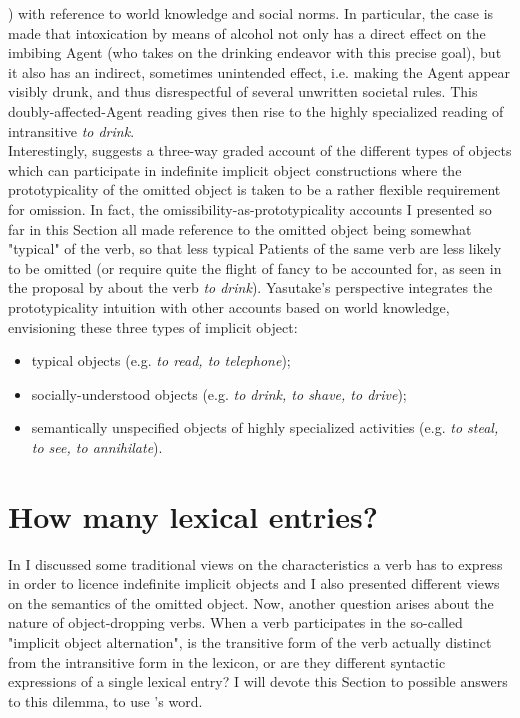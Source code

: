 \textcite[420]{Naess2011}) with reference to world knowledge and social norms. In particular, the case is made that intoxication by means of alcohol not only has a direct effect on the imbibing Agent (who takes on the drinking endeavor with this precise goal), but it also has an indirect, sometimes unintended effect, i.e. making the Agent appear visibly drunk, and thus disrespectful of several unwritten societal rules. This doubly-affected-Agent reading gives then rise to the highly specialized reading of intransitive \textit{to drink}.\\
Interestingly, \textcite[48-50]{Yasutake1987} suggests a three-way graded account of the different types of objects which can participate in indefinite implicit object constructions where the prototypicality of the omitted object is taken to be a rather flexible requirement for omission. In fact, the omissibility-as-prototypicality accounts I presented so far in this Section all made reference to the omitted object being somewhat "typical" of the verb, so that less typical Patients of the same verb are less likely to be omitted (or require quite the flight of fancy to be accounted for, as seen in the proposal by \textcite{HuddlestonEtAl2002} about the verb \textit{to drink}). Yasutake's perspective integrates the prototypicality intuition with other accounts based on world knowledge, envisioning these three types of implicit object:
\begin{itemize}
    \item typical objects (e.g. \textit{to read, to telephone});
    \item socially-understood objects (e.g. \textit{to drink, to shave, to drive});
    \item semantically unspecified objects of highly specialized activities (e.g. \textit{to steal, to see, to annihilate}).
\end{itemize}


\section{How many lexical entries?} 

In  I discussed some traditional views on the characteristics a verb has to express in order to licence indefinite implicit objects and I also presented different views on the semantics of the omitted object. Now, another question arises about the nature of object-dropping verbs. When a verb participates in the so-called "implicit object alternation", is the transitive form of the verb actually distinct from the intransitive form in the lexicon, or are they different syntactic expressions of a single lexical entry? I will devote this Section to possible answers to this dilemma, to use \textcite{Gillon2012}'s word.


